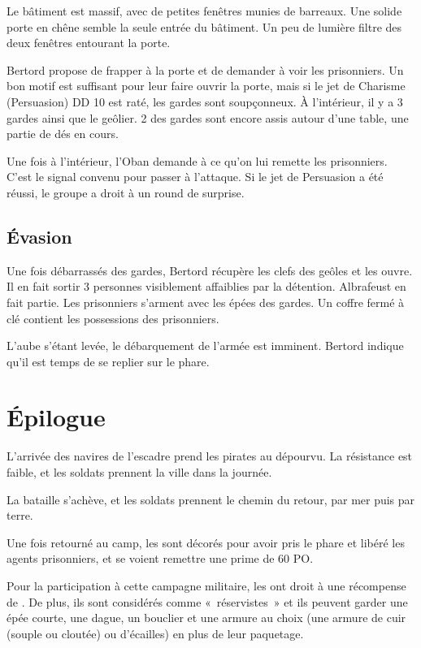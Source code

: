 \documentclass[a4paper,10pt,openany]{book}
\begin{document}
\begin{multicols}{2}
\begin{paperbox}{ }
	Le bâtiment est massif, avec de petites fenêtres munies de barreaux. Une solide porte en chêne semble la seule entrée du bâtiment. Un peu de lumière
	filtre des deux fenêtres entourant la porte.
\end{paperbox}

Bertord propose de frapper à la porte et de demander à voir les prisonniers. Un bon motif est suffisant pour leur faire ouvrir la porte, mais si le
jet de Charisme (Persuasion) DD 10 est raté, les gardes sont soupçonneux. À l’intérieur, il y a 3 gardes ainsi que le geôlier. 2 des gardes sont
encore assis autour d’une table, une partie de dés en cours.\par Une fois à l’intérieur, l’Oban demande à ce qu’on lui remette les prisonniers. C’est le
signal convenu pour passer à l’attaque. Si le jet de Persuasion a été réussi, le groupe a droit à un round de surprise.

\subsection{Évasion}
Une fois débarrassés des gardes, Bertord récupère les clefs des geôles et les ouvre. Il en fait sortir 3 personnes visiblement affaiblies par la
détention. Albrafeust en fait partie. Les prisonniers s’arment avec les épées des gardes. Un coffre fermé à clé contient les possessions des
prisonniers.\par L’aube s’étant levée, le débarquement de l’armée est imminent. Bertord indique qu’il est temps de se replier sur le phare.

\section{Épilogue}
L’arrivée des navires de l’escadre prend les pirates au dépourvu. La résistance est faible, et les soldats prennent la ville dans la journée.\par La
bataille s’achève, et les soldats prennent le chemin du retour, par mer puis par terre.\par Une fois retourné au camp, les \PJs sont décorés
pour avoir pris le phare et libéré les agents prisonniers, et se voient remettre une prime de 60 PO.\par Pour la participation à cette campagne
militaire, les \PJs ont droit à une récompense de . De plus, ils sont considérés comme « réservistes » et ils peuvent garder une épée
courte, une dague, un bouclier et une armure au choix (une armure de cuir (souple ou cloutée) ou d’écailles) en plus de leur paquetage.


\end{multicols}
\end{document}
